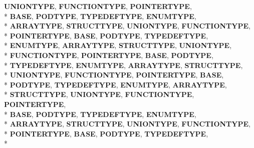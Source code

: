 \begin{DoxyCompactItemize}
{\bfseries U\-N\-I\-O\-N\-T\-Y\-P\-E}, 
{\bfseries F\-U\-N\-C\-T\-I\-O\-N\-T\-Y\-P\-E}, 
{\bfseries P\-O\-I\-N\-T\-E\-R\-T\-Y\-P\-E}, 
\\*
{\bfseries B\-A\-S\-E}, 
{\bfseries P\-O\-D\-T\-Y\-P\-E}, 
{\bfseries T\-Y\-P\-E\-D\-E\-F\-T\-Y\-P\-E}, 
{\bfseries E\-N\-U\-M\-T\-Y\-P\-E}, 
\\*
{\bfseries A\-R\-R\-A\-Y\-T\-Y\-P\-E}, 
{\bfseries S\-T\-R\-U\-C\-T\-T\-Y\-P\-E}, 
{\bfseries U\-N\-I\-O\-N\-T\-Y\-P\-E}, 
{\bfseries F\-U\-N\-C\-T\-I\-O\-N\-T\-Y\-P\-E}, 
\\*
{\bfseries P\-O\-I\-N\-T\-E\-R\-T\-Y\-P\-E}, 
{\bfseries B\-A\-S\-E}, 
{\bfseries P\-O\-D\-T\-Y\-P\-E}, 
{\bfseries T\-Y\-P\-E\-D\-E\-F\-T\-Y\-P\-E}, 
\\*
{\bfseries E\-N\-U\-M\-T\-Y\-P\-E}, 
{\bfseries A\-R\-R\-A\-Y\-T\-Y\-P\-E}, 
{\bfseries S\-T\-R\-U\-C\-T\-T\-Y\-P\-E}, 
{\bfseries U\-N\-I\-O\-N\-T\-Y\-P\-E}, 
\\*
{\bfseries F\-U\-N\-C\-T\-I\-O\-N\-T\-Y\-P\-E}, 
{\bfseries P\-O\-I\-N\-T\-E\-R\-T\-Y\-P\-E}, 
{\bfseries B\-A\-S\-E}, 
{\bfseries P\-O\-D\-T\-Y\-P\-E}, 
\\*
{\bfseries T\-Y\-P\-E\-D\-E\-F\-T\-Y\-P\-E}, 
{\bfseries E\-N\-U\-M\-T\-Y\-P\-E}, 
{\bfseries A\-R\-R\-A\-Y\-T\-Y\-P\-E}, 
{\bfseries S\-T\-R\-U\-C\-T\-T\-Y\-P\-E}, 
\\*
{\bfseries U\-N\-I\-O\-N\-T\-Y\-P\-E}, 
{\bfseries F\-U\-N\-C\-T\-I\-O\-N\-T\-Y\-P\-E}, 
{\bfseries P\-O\-I\-N\-T\-E\-R\-T\-Y\-P\-E}, 
{\bfseries B\-A\-S\-E}, 
\\*
{\bfseries P\-O\-D\-T\-Y\-P\-E}, 
{\bfseries T\-Y\-P\-E\-D\-E\-F\-T\-Y\-P\-E}, 
{\bfseries E\-N\-U\-M\-T\-Y\-P\-E}, 
{\bfseries A\-R\-R\-A\-Y\-T\-Y\-P\-E}, 
\\*
{\bfseries S\-T\-R\-U\-C\-T\-T\-Y\-P\-E}, 
{\bfseries U\-N\-I\-O\-N\-T\-Y\-P\-E}, 
{\bfseries F\-U\-N\-C\-T\-I\-O\-N\-T\-Y\-P\-E}, 
{\bfseries P\-O\-I\-N\-T\-E\-R\-T\-Y\-P\-E}, 
\\*
{\bfseries B\-A\-S\-E}, 
{\bfseries P\-O\-D\-T\-Y\-P\-E}, 
{\bfseries T\-Y\-P\-E\-D\-E\-F\-T\-Y\-P\-E}, 
{\bfseries E\-N\-U\-M\-T\-Y\-P\-E}, 
\\*
{\bfseries A\-R\-R\-A\-Y\-T\-Y\-P\-E}, 
{\bfseries S\-T\-R\-U\-C\-T\-T\-Y\-P\-E}, 
{\bfseries U\-N\-I\-O\-N\-T\-Y\-P\-E}, 
{\bfseries F\-U\-N\-C\-T\-I\-O\-N\-T\-Y\-P\-E}, 
\\*
{\bfseries P\-O\-I\-N\-T\-E\-R\-T\-Y\-P\-E}, 
{\bfseries B\-A\-S\-E}, 
{\bfseries P\-O\-D\-T\-Y\-P\-E}, 
{\bfseries T\-Y\-P\-E\-D\-E\-F\-T\-Y\-P\-E}, 
\\*

\end{DoxyCompactItemize}
